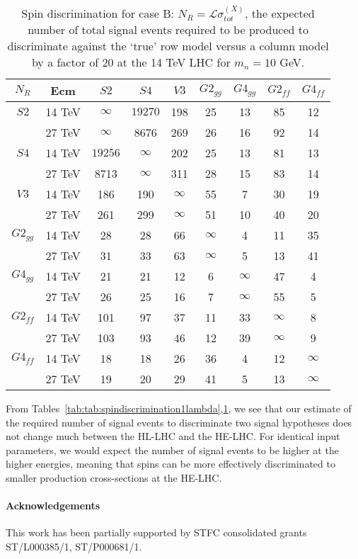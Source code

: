 \begin{table}[h!]
	\begin{center}
		\begin{tabular}{|c||c|c|c|c|c|c|c|c|} 
			\hline
			$N_R$  & Ecm     & $S2$    & $S4$ & $V3$ & $G2_{gg}$ & $G4_{gg}$ & $G2_{ff}$ & $G4_{ff}$ \\ \hline
			\hline
			$S2$  & 14 TeV     & $\infty$&$19270$     &198&25&13&85&12  \\  
			      & {27 TeV}     & $\infty$ & 8676 & 269 & 26 & 16 & 92 & 14  \\ \hline \hline  
			$S4$  & 14 TeV     &  $19256$   &$\infty$ &202&25&13&81&13\\   
		& { 27 TeV}	&  8713   & $\infty$  & 311 & 28 & 15 & 83 & 14\\ \hline  \hline  
			$V3$  & 14 TeV     & 186  & 190  & $\infty$  & 55 & 7 & 30 & 19 \\  
& { 27 TeV}			& 261   & 299 & $\infty$ & 51 & 10 & 40 & 20 \\ \hline \hline  
			$G2_{gg}$& 14 TeV  &  28    &28&66&$\infty$ &4&11&35      \\  
		& { 27 TeV}	& 31  & 33 & 63 & $\infty$ & 5 & 13 & 41      \\ \hline \hline  
			$G4_{gg}$& 14 TeV  &   21   &21&12&6&$\infty$ &47&4\\  
		&{ 27 TeV} &  26   & 25 & 16 & 7  & $\infty$ & 55 & 5\\ \hline  	\hline  
			$G2_{ff}$& 14 TeV  &   101   &97&37&11&33&$\infty$ & 8   \\  
		& { 27 TeV} &  103  & 93 & 46 & 12 & 39 &$\infty$ & 9   \\ \hline 	\hline  
			$G4_{ff}$& 14 TeV  &   18   &18&26&36&4&12&$\infty$ \\     
		& { 27 TeV} &  19   & 20 & 29 & 41 & 5 & 13 &$\infty$ \\ \hline\hline  
		\end{tabular}
		\label{tab:spindiscrimination}
	\end{center}
	\caption{Spin discrimination for case B: $N_R = {\mathcal L}
		\sigma_{tot}^{(X)}$, the expected
		number of total signal events required to be produced 
		to discriminate against the `true' row
		model versus a column model by a factor of 20 at the 14 TeV
		LHC for $m_n=10$ GeV. \label{tab:two}} 
\end{table}
From Tables~\ref{tab:tab:spindiscrimination1lambda},\ref{tab:two}, we see that our estimate of the required number of signal events to discriminate two signal hypotheses does not change much between the HL-LHC and the HE-LHC. For identical input parameters, we would expect the number of signal events to be higher at the higher energies, meaning that spins can be more effectively discriminated to smaller production cross-sections at the HE-LHC.

\paragraph*{Acknowledgements}
This work has been partially supported by STFC consolidated grants ST/L000385/1, ST/P000681/1.
